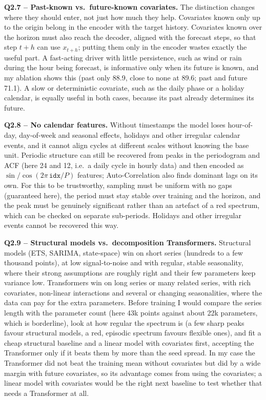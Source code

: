 \documentclass[11pt]{article}
\begin{document}
\textbf{Q2.7 -- Past-known vs.\ future-known covariates.} The distinction changes where they should
enter, not just how much they help. Covariates known only up to the origin belong in the encoder
with the target history. Covariates known over the horizon must also reach the decoder, aligned
with the forecast steps, so that step $t+h$ can use $x_{t+h}$; putting them only in the encoder
wastes exactly the useful part. A fast-acting driver with little persistence, such as wind or rain
during the hour being forecast, is informative only when its future is known, and my ablation
shows this (past only 88.9, close to none at 89.6; past and future 71.1). A slow or deterministic
covariate, such as the daily phase or a holiday calendar, is equally useful in both cases, because
its past already determines its future.

\textbf{Q2.8 -- No calendar features.} Without timestamps the model loses hour-of-day, day-of-week
and seasonal effects, holidays and other irregular calendar events, and it cannot align cycles at
different scales without knowing the base unit. Periodic structure can still be recovered from
peaks in the periodogram and ACF (here 24 and 12, i.e.\ a daily cycle in hourly data) and then
encoded as $\sin/\cos(2\pi\,\texttt{idx}/P)$ features; Auto-Correlation also finds dominant lags on
its own. For this to be trustworthy, sampling must be uniform with no gaps (guaranteed here), the
period must stay stable over training and the horizon, and the peak must be genuinely significant
rather than an artefact of a red spectrum, which can be checked on separate sub-periods. Holidays
and other irregular events cannot be recovered this way.

\textbf{Q2.9 -- Structural models vs.\ decomposition Transformers.} Structural models (ETS, SARIMA,
state-space) win on short series (hundreds to a few thousand points), at low signal-to-noise and
with regular, stable seasonality, where their strong assumptions are roughly right and their few
parameters keep variance low. Transformers win on long series or many related series, with rich
covariates, non-linear interactions and several or changing seasonalities, where the data can pay
for the extra parameters. Before training I would compare the series length with the parameter
count (here 43k points against about 22k parameters, which is borderline), look at how regular the
spectrum is (a few sharp peaks favour structural models, a red, episodic spectrum favours flexible
ones), and fit a cheap structural baseline and a linear model with covariates first, accepting the
Transformer only if it beats them by more than the seed spread. In my case the Transformer did not
beat the training mean without covariates but did by a wide margin with future covariates, so its
advantage comes from using the covariates; a linear model with covariates would be the right next
baseline to test whether that needs a Transformer at all.
\end{document}
